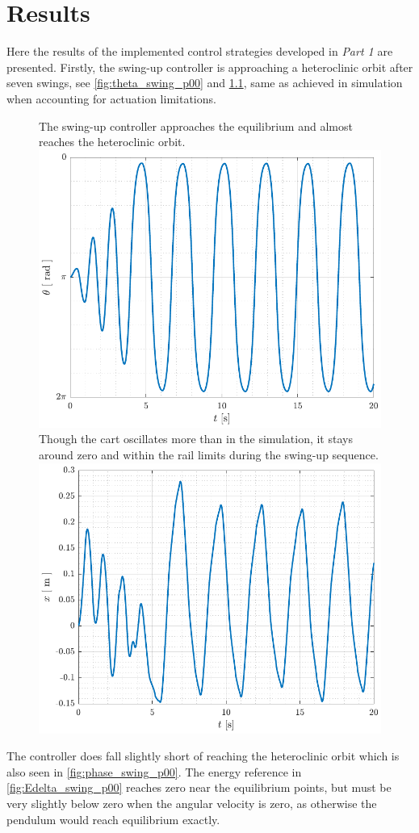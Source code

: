 %
\chapter{Results}
Here the results of the implemented control strategies developed in \textit{Part 1} are presented. Firstly, the swing-up controller is approaching a heteroclinic orbit after seven swings, see \autoref{fig:theta_swing_p00} and \ref{fig:x_swing_p00}, same as achieved in simulation when accounting for actuation limitations.
%
%
\begin{figure}[H]
  \hspace{1cm}
  \captionbox
  {
    The swing-up controller approaches the equilibrium and almost reaches the heteroclinic orbit.
    \label{fig:theta_swing_p00}
  }
  {
    \hspace{-1cm}
    \includegraphics[width=.39\textwidth]{figures/theta_swing_p00}
  }
  \hspace{20pt}
  \captionbox 
  {
    Though the cart oscillates more than in the simulation, it stays around zero and within the rail limits during the swing-up sequence.
    \label{fig:x_swing_p00}
  }
  {
    \hspace{-1cm}
    \includegraphics[width=.4\textwidth]{figures/x_swing_p00}
  }  
\end{figure}
%
The controller does fall slightly short of reaching the heteroclinic orbit which is also seen in \autoref{fig:phase_swing_p00}. The energy reference in \autoref{fig:Edelta_swing_p00} reaches zero near the equilibrium points, but must be very slightly below zero when the angular velocity is zero, as otherwise the pendulum would reach equilibrium exactly.
